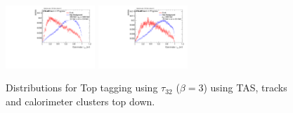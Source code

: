 \begin{figure}
\includegraphics[width=0.3\textwidth]{sascha_input/Appendix/Distributions/top/distributions/beta3/h_recoJet_nSub32_3_bin5.pdf} \hspace{6mm}
\includegraphics[width=0.3\textwidth]{sascha_input/Appendix/Distributions/top/distributions/beta3/h_recoJet_nSub32_3_bin6.pdf}
\caption{\footnotesize{Distributions for Top tagging using $\tau_{32}$ ($\beta=3$) using TAS, tracks and calorimeter clusters top down.}}
\end{figure}

